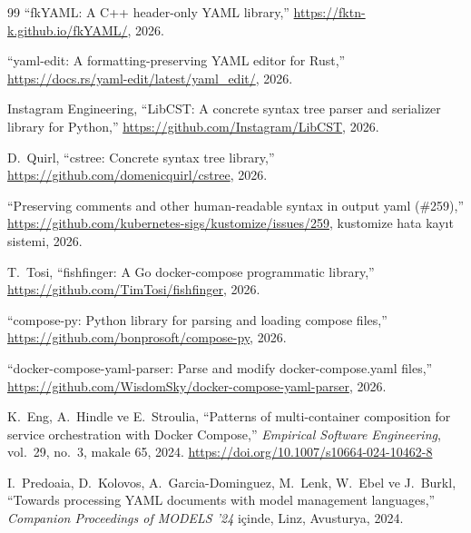 \documentclass[12pt,a4paper]{article}
\begin{document}
\begin{thebibliography}{99}
``fk{YAML}: A {C++} header-only {YAML} library,'' \url{https://fktn-k.github.io/fkYAML/}, 2026.

``yaml-edit: A formatting-preserving {YAML} editor for {Rust},'' \url{https://docs.rs/yaml-edit/latest/yaml_edit/}, 2026.

Instagram Engineering, ``{LibCST}: A concrete syntax tree parser and serializer library for {Python},'' \url{https://github.com/Instagram/LibCST}, 2026.

D.~Quirl, ``cstree: Concrete syntax tree library,'' \url{https://github.com/domenicquirl/cstree}, 2026.

``Preserving comments and other human-readable syntax in output yaml (\#259),'' \url{https://github.com/kubernetes-sigs/kustomize/issues/259}, kustomize hata kayıt sistemi, 2026.

T.~Tosi, ``fishfinger: A {Go} docker-compose programmatic library,'' \url{https://github.com/TimTosi/fishfinger}, 2026.

``compose-py: {Python} library for parsing and loading compose files,'' \url{https://github.com/bonprosoft/compose-py}, 2026.

``docker-compose-yaml-parser: Parse and modify docker-compose.yaml files,'' \url{https://github.com/WisdomSky/docker-compose-yaml-parser}, 2026.

K.~Eng, A.~Hindle ve E.~Stroulia, ``Patterns of multi-container composition for service orchestration with {Docker Compose},'' \emph{Empirical Software Engineering}, vol.~29, no.~3, makale 65, 2024. \url{https://doi.org/10.1007/s10664-024-10462-8}

I.~Predoaia, D.~Kolovos, A.~Garcia-Dominguez, M.~Lenk, W.~Ebel ve J.~Burkl, ``Towards processing {YAML} documents with model management languages,'' \emph{Companion Proceedings of MODELS '24} içinde, Linz, Avusturya, 2024.
\end{thebibliography}
\end{document}
